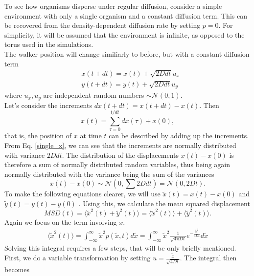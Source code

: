 \documentclass{article}
\begin{document}
To see how organisms disperse under regular diffusion, consider a simple environment with only a single organism and a constant diffusion term. 
This can be recovered from the density-dependent diffusion rate by setting $p=0$.
For simplicity, it will be assumed that the environment is infinite, as opposed to the torus used in the simulations.\\
The walker position will change similiarly to before, but with a constant diffusion term
\begin{align}
    & x(t + dt) = x(t) + \sqrt{2D dt} u_x \label{single_x}\\
    & y(t + dt) = y(t) + \sqrt{2D dt} u_y
\end{align}
where $u_x, u_y$ are independent random numbers $\sim \mathcal{N}(0,1)$.\\
Let's consider the increments $dx(t+dt) = x(t + dt) - x(t)$.
Then 
\begin{equation*}
    x(t) = \sum_{\tau = 0}^{t/dt} dx(\tau) + x(0),
\end{equation*}
that is, the position of $x$ at time $t$ can be described by adding up the increments.
From Eq. \ref{single_x}, we can see that the increments are normally distributed with variance $2D dt$.
The distribution of the displacements $x(t) - x(0)$ is therefore a sum of normally distributed random variables, thus being again normally distributed with the variance being the sum of the variances 
\begin{equation*}
    x(t) - x(0) \sim \mathcal{N}(0,\sum 2D dt) =  \mathcal{N}(0,2Dt).
\end{equation*}
To make the following equations clearer, we will use $\tilde{x}(t) = x(t)-x(0)$ and $\tilde{y}(t) = y(t)-y(0)$ .
Using this, we calculate the mean squared displacement 
\begin{equation*}
    MSD(t) = \langle \tilde{x}^2(t) +\tilde{y}^2(t) \rangle = \langle \tilde{x}^2(t)\rangle + \langle\tilde{y}^2(t) \rangle.
\end{equation*}
Again we focus on the term involving $x$.
\begin{align*}
    \langle \tilde{x}^2(t)\rangle = \int_{-\infty}^{\infty} \tilde{x}^2 p(\tilde{x},t)d\tilde{x} = \int_{-\infty}^{\infty} \tilde{x}^2 \frac{1}{\sqrt{4\pi Dt}} e^{-\frac{\tilde{x}^2}{4Dt}}d\tilde{x}
\end{align*}
Solving this integral requires a few steps, that will be only briefly mentioned. 
First, we do a variable transformation by setting $u = \frac{\tilde{x}}{\sqrt{4Dt}}$. 
The integral then becomes
\end{document}

